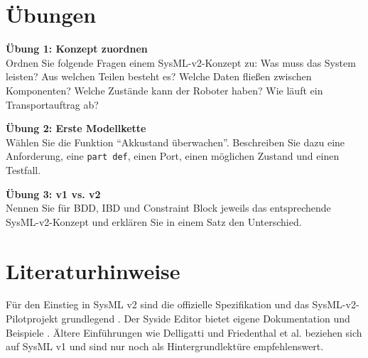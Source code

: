 \section{Übungen}
\begin{uebungbox}
\textbf{Übung 1: Konzept zuordnen}\\
Ordnen Sie folgende Fragen einem SysML-v2-Konzept zu: Was muss das System leisten? Aus welchen Teilen besteht es? Welche Daten fließen zwischen Komponenten? Welche Zustände kann der Roboter haben? Wie läuft ein Transportauftrag ab?
\end{uebungbox}

\begin{uebungbox}
\textbf{Übung 2: Erste Modellkette}\\
Wählen Sie die Funktion \enquote{Akkustand überwachen}. Beschreiben Sie dazu eine Anforderung, eine \texttt{part def}, einen Port, einen möglichen Zustand und einen Testfall.
\end{uebungbox}

\begin{uebungbox}
\textbf{Übung 3: v1 vs. v2}\\
Nennen Sie für BDD, IBD und Constraint Block jeweils das entsprechende SysML-v2-Konzept und erklären Sie in einem Satz den Unterschied.
\end{uebungbox}

\section{Literaturhinweise}
Für den Einstieg in SysML v2 sind die offizielle Spezifikation und das SysML-v2-Pilotprojekt grundlegend \cite{sysmlv2pilot}. Der Syside Editor bietet eigene Dokumentation und Beispiele \cite{syside}. Ältere Einführungen wie Delligatti \cite{delligatti2014} und Friedenthal et al. \cite{friedenthal2014} beziehen sich auf SysML v1 und sind nur noch als Hintergrundlektüre empfehlenswert.
